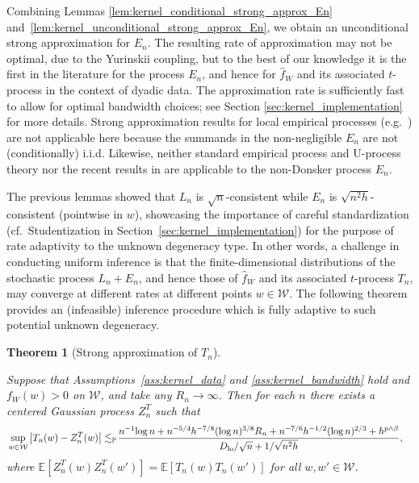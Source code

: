 \documentclass[11pt,lof]{puthesis}
\renewcommand{\P}{\ensuremath{\mathbb{P}}}
\newcommand{\E}{\ensuremath{\mathbb{E}}}
\newcommand{\cW}{\ensuremath{\mathcal{W}}}
\newcommand{\Dl}{\ensuremath{D_{\textup{lo}}}}
\theoremstyle{break}
\newtheorem{theorem}{Theorem}[section]
\theoremstyle{proof}
\begin{document}
Combining Lemmas \ref{lem:kernel_conditional_strong_approx_En}
and~\ref{lem:kernel_unconditional_strong_approx_En}, we obtain
an unconditional strong
approximation for $E_n$. The resulting rate of approximation may not be
optimal, due to the Yurinskii coupling, but to the best of our knowledge it is
the first in the literature for the process $E_n$, and hence for $\hat{f}_W$
and its associated $t$-process in the context of dyadic data. The approximation
rate is sufficiently fast to allow for optimal bandwidth choices; see Section
\ref{sec:kernel_implementation} for more details. Strong approximation results
for local empirical processes (e.g.\ \citealp{gine2010confidence}) are not
applicable here because the summands in the non-negligible $E_n$ are not
(conditionally) i.i.d. Likewise, neither standard empirical process and
U-process theory \citep{van1996weak,gine2021mathematical} nor the recent results
in \citet{davezies2021exchangeable} are applicable to the non-Donsker process
$E_n$.

The previous lemmas showed that $L_n$ is $\sqrt{n}$-consistent while $E_n$ is
$\sqrt{n^2h}$-consistent (pointwise in $w$), showcasing the importance of
careful standardization (cf.\ Studentization in
Section~\ref{sec:kernel_implementation}) for the purpose of rate adaptivity to
the unknown degeneracy type. In other words, a challenge in conducting uniform
inference is that the finite-dimensional distributions of the stochastic process
$L_n+E_n$, and hence those of $\hat{f}_W$ and its associated $t$-process $T_n$,
may converge at different rates at different points $w\in\cW$. The following
theorem provides an (infeasible) inference procedure which is fully adaptive to
such potential unknown degeneracy.

\begin{theorem}[Strong approximation of $T_n$]
  \label{thm:kernel_strong_approx_Tn}

  Suppose that Assumptions~\ref{ass:kernel_data} and \ref{ass:kernel_bandwidth}
  hold and $f_W(w) > 0$ on $\cW$, and take any $R_n \to \infty$. Then for each
  $n$ there exists a centered Gaussian process $Z_n^{T}$ such that
  \begin{align*}
    &\sup_{w \in \cW} \left| T_n(w) - Z_n^{T}(w) \right|
    \lesssim_\P \!
    \frac{
      n^{-1} \! \log n
      + n^{-5/4} h^{-7/8} (\log n)^{3/8} R_n
      + n^{-7/6} h^{-1/2} (\log n)^{2/3}
    + h^{p\wedge\beta}}
    {\Dl/\sqrt{n} + 1/\sqrt{n^2h}},
  \end{align*}
  where $\E[Z_n^T(w)Z_n^T(w')] = \E[T_n(w)T_n(w')]$ for all $w,w' \in \cW$.
\end{theorem}
\end{document}
